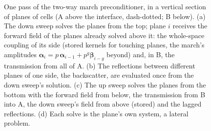 \documentclass[11pt,a4paper]{article}
\begin{document}
\begin{figure}[t]
\caption{One pass of the two-way march preconditioner, in a vertical section of planes of cells (A above the
interface, dash-dotted; B below). (a) The down sweep solves the planes from the top; plane $i$ receives the
forward field of the planes already solved above it: the whole-space coupling of its side (stored kernels for
touching planes, the march's amplitudes $\boldsymbol\alpha_i=p\,\boldsymbol\alpha_{i-1}+p^g\boldsymbol\beta_{i-g}$
beyond) and, in B, the transmission from all of A. (b) The reflections between different planes of one side, the
backscatter, are evaluated once from the down sweep's solution. (c) The up sweep solves the planes from the
bottom with the forward field from below, the transmission from B into A, the down sweep's field from above
(stored) and the lagged reflections. (d) Each solve is the plane's own system, a lateral problem.}
\label{fig:downup}
\end{figure}
\end{document}
